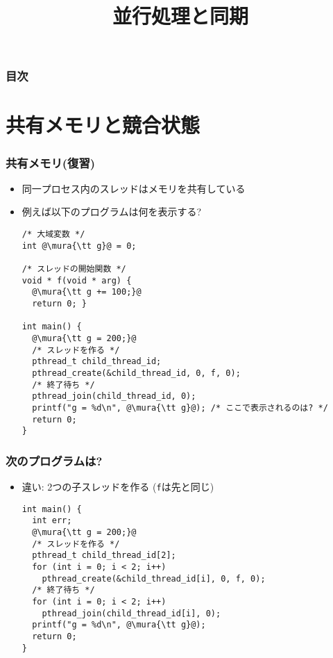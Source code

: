 \documentclass[12pt,dvipdfmx]{beamer}
\title{並行処理と同期}
\begin{document}
\maketitle

\begin{frame}
\frametitle{目次}
\tableofcontents
\end{frame}

\section{共有メモリと競合状態}

\begin{frame}[fragile]
  \frametitle{共有メモリ(復習)}
  \begin{itemize}
  \item 同一プロセス内のスレッドはメモリを共有している
  \item 例えば以下のプログラムは何を表示する?

\begin{lstlisting}
/* 大域変数 */
int @\mura{\tt g}@ = 0;

/* スレッドの開始関数 */
void * f(void * arg) {
  @\mura{\tt g += 100;}@
  return 0; }

int main() {
  @\mura{\tt g = 200;}@
  /* スレッドを作る */
  pthread_t child_thread_id;
  pthread_create(&child_thread_id, 0, f, 0);
  /* 終了待ち */
  pthread_join(child_thread_id, 0);
  printf("g = %d\n", @\mura{\tt g}@); /* ここで表示されるのは? */
  return 0;
}
\end{lstlisting} 
  \end{itemize}
\end{frame} 

\begin{frame}[fragile]
  \frametitle{次のプログラムは?}
  \begin{itemize}
  \item 違い: 2つの子スレッドを作る ({\tt f}は先と同じ)
\begin{lstlisting}
int main() {
  int err;
  @\mura{\tt g = 200;}@
  /* スレッドを作る */
  pthread_t child_thread_id[2];
  for (int i = 0; i < 2; i++)
    pthread_create(&child_thread_id[i], 0, f, 0);
  /* 終了待ち */
  for (int i = 0; i < 2; i++)
    pthread_join(child_thread_id[i], 0);
  printf("g = %d\n", @\mura{\tt g}@);
  return 0;
}
\end{lstlisting} 
\end{itemize}
\end{frame}
\end{document}
